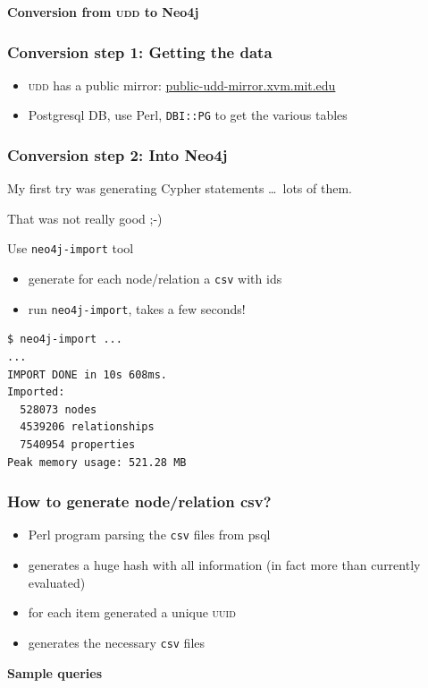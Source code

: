 \documentclass[hyperref]{beamer}
\newcommand{\acro}[1]{\textsc{\MakeLowercase{#1}}}
\newcommand{\cutin}[1]{%
\begin{frame}[c]\begin{center}{\Large\bf\color{myblue}#1}\end{center}\end{frame}}
\def\bis{\\[\bigskipamount]}
\begin{document}
\cutin{Conversion from \acro{UDD} to Neo4j}

\begin{frame}[fragile]
  \frametitle{Conversion step 1: Getting the data}
  \begin{itemize}
  \item \acro{UDD} has a public mirror:
    \url{public-udd-mirror.xvm.mit.edu}\bis
  \item Postgresql DB, use Perl, \texttt{DBI::PG} to get the various tables
  \end{itemize}
\end{frame}

\begin{frame}[fragile]
  \frametitle{Conversion step 2: Into Neo4j}
  My first try was generating Cypher statements \ldots\ lots of them.

  \pause That was not really good ;-)\pause

  \begin{block}{Use \texttt{neo4j-import} tool}
    \begin{itemize}
    \item generate for each node/relation a \texttt{csv} with ids
    \item run \texttt{neo4j-import}, takes a few seconds!
    \end{itemize}
  \end{block}
  \pause
  \begin{lstlisting}
$ neo4j-import ...
...
IMPORT DONE in 10s 608ms. 
Imported:
  528073 nodes
  4539206 relationships
  7540954 properties
Peak memory usage: 521.28 MB
\end{lstlisting}
\end{frame}


\begin{frame}
  \frametitle{How to generate node/relation csv?}
  \begin{itemize}
  \item Perl program parsing the \texttt{csv} files from psql\bis
  \item generates a huge hash with all information (in fact more than
    currently evaluated)\bis
  \item for each item generated a unique \acro{UUID}\bis
  \item generates the necessary \texttt{csv} files
  \end{itemize}
\end{frame}

\cutin{Sample queries}
\end{document}
